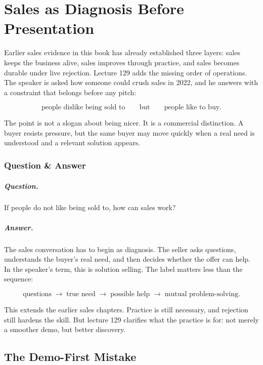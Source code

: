 \documentclass[11pt,oneside]{book}
\begin{document}
\chapter{Sales as Diagnosis Before Presentation}

Earlier sales evidence in this book has already established three layers: sales keeps the business alive, sales improves through practice, and sales becomes durable under live rejection. Lecture 129 adds the missing order of operations. The speaker is asked how someone could crush sales in 2022, and he answers with a constraint that belongs before any pitch:

\[
\text{people dislike being sold to}
\qquad\text{but}\qquad
\text{people like to buy}.
\]

The point is not a slogan about being nicer. It is a commercial distinction. A buyer resists pressure, but the same buyer may move quickly when a real need is understood and a relevant solution appears.

\subsection{Question \& Answer}

\paragraph{Question.}
If people do not like being sold to, how can sales work?

\paragraph{Answer.}
The sales conversation has to begin as diagnosis. The seller asks questions, understands the buyer's real need, and then decides whether the offer can help. In the speaker's term, this is solution selling. The label matters less than the sequence:

\[
\text{questions}
\;\longrightarrow\;
\text{true need}
\;\longrightarrow\;
\text{possible help}
\;\longrightarrow\;
\text{mutual problem-solving}.
\]

This extends the earlier sales chapters. Practice is still necessary, and rejection still hardens the skill. But lecture 129 clarifies what the practice is for: not merely a smoother demo, but better discovery.

\section{The Demo-First Mistake}
\end{document}
